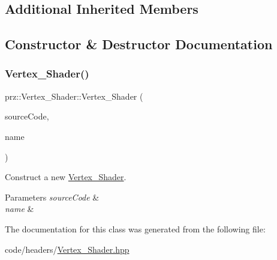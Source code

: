 \subsection*{Additional Inherited Members}


\subsection{Constructor \& Destructor Documentation}
\mbox{\label{classprz_1_1_vertex___shader_a9f8a41c693e6ce7088bc831c10e8005e}} 
\subsubsection{\texorpdfstring{Vertex\_Shader()}{Vertex\_Shader()}}
{\footnotesize\ttfamily prz\+::\+Vertex\+\_\+\+Shader\+::\+Vertex\+\_\+\+Shader (\begin{DoxyParamCaption}\item[{const \mbox{\hyperlink{classprz_1_1_source___code}{Source\+\_\+\+Code}} \&}]{source\+Code,  }\item[{const P\+String \&}]{name }\end{DoxyParamCaption})\hspace{0.3cm}{\ttfamily [inline]}}



Construct a new \mbox{\hyperlink{classprz_1_1_vertex___shader}{Vertex\+\_\+\+Shader}}. 


\begin{DoxyParams}{Parameters}
{\em source\+Code} & \\
\hline
{\em name} & \\
\hline
\end{DoxyParams}


The documentation for this class was generated from the following file\+:\begin{DoxyCompactItemize}
\item 
code/headers/\mbox{\hyperlink{_vertex___shader_8hpp}{Vertex\+\_\+\+Shader.\+hpp}}\end{DoxyCompactItemize}

